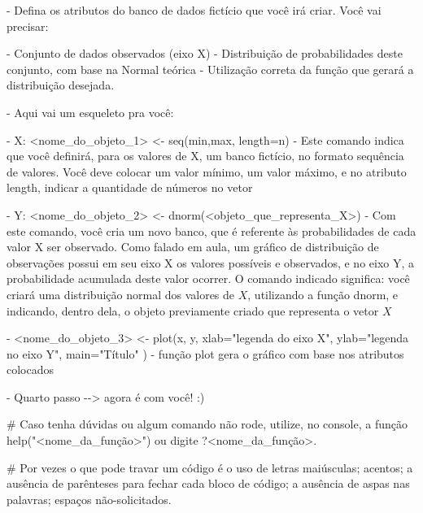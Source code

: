 \documentclass[
]{article}
\newenvironment{Shaded}{\begin{snugshade}}{\end{snugshade}}
\newcommand{\NormalTok}[1]{#1}
\begin{document}
\begin{Shaded}
\begin{Highlighting}[]

\NormalTok{{-}  Defina os atributos do banco de dados fictício que você irá criar. Você vai precisar:}

\NormalTok{  {-}  Conjunto de dados observados (eixo X)}
\NormalTok{  {-}  Distribuição de probabilidades deste conjunto, com base na Normal teórica}
\NormalTok{  {-}  Utilização correta da função que gerará a distribuição desejada.}
  
  
\NormalTok{{-}  Aqui vai um esqueleto pra você:}


\NormalTok{  {-}  X: \textless{}nome\_do\_objeto\_1\textgreater{} \textless{}{-} seq(min,max, length=n) {-} Este comando indica }
\NormalTok{  que você definirá, para os valores de X, um banco fictício, no formato sequência }
\NormalTok{  de valores. Você deve colocar um valor mínimo, um valor máximo, e no atributo length, }
\NormalTok{  indicar a quantidade de números no vetor}
  
  
\NormalTok{  {-}  Y: \textless{}nome\_do\_objeto\_2\textgreater{} \textless{}{-} dnorm(\textless{}objeto\_que\_representa\_X\textgreater{}) {-} Com este comando, }
\NormalTok{  você cria um novo banco, que é referente às probabilidades de cada valor X ser observado. }
\NormalTok{  Como falado em aula, um gráfico de distribuição de observações possui em seu eixo X }
\NormalTok{  os valores possíveis e observados, e no eixo Y, a probabilidade acumulada deste }
\NormalTok{  valor ocorrer. O comando indicado significa: você criará uma distribuição normal }
\NormalTok{  dos valores de $X$, utilizando a função dnorm, e indicando, dentro dela, o objeto}
\NormalTok{  previamente criado que representa o vetor $X$ }
  
  
\NormalTok{  {-} \textless{}nome\_do\_objeto\_3\textgreater{} \textless{}{-} plot(x, y, xlab="legenda do eixo X", ylab="legenda no eixo Y", }
\NormalTok{  main="Título" ) {-} função plot gera o gráfico com base nos atributos colocados}
  
  
\NormalTok{  {-}  Quarto passo {-}{-}\textgreater{} agora é com você! :)}


\NormalTok{\#  Caso tenha dúvidas ou algum comando não rode, utilize, no console, }
\NormalTok{a função help("\textless{}nome\_da\_função\textgreater{}") ou digite ?\textless{}nome\_da\_função\textgreater{}.}


\NormalTok{\#  Por vezes o que pode travar um código é o uso de letras maiúsculas; acentos; }
\NormalTok{a ausência de parênteses para fechar cada bloco de código; a ausência de aspas }
\NormalTok{nas palavras; espaços não{-}solicitados.}
\end{Highlighting}
\end{Shaded}
\end{document}
